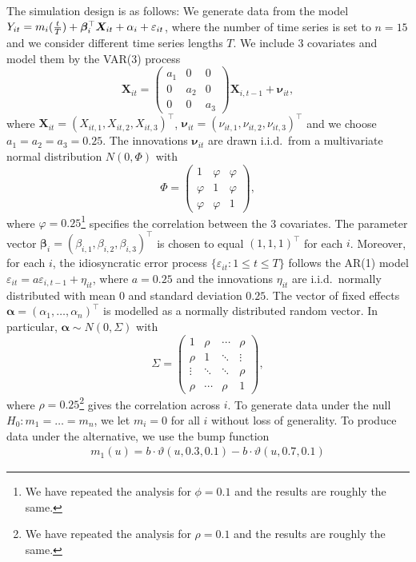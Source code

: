 \documentclass[12pt]{article}
\begin{document}
The simulation design is as follows: We generate data from the model $Y_{it} = m_i(\frac{t}{T}) + \bm{\beta}_i^\top \boldsymbol{X}_{it} +  \alpha_i  + \varepsilon_{it}$, where the number of time series is set to $n = 15$ and we consider different time series lengths $T$. We include $3$ covariates and model them by the VAR(3) process
\[ \boldsymbol{X}_{it} = \begin{pmatrix} a_1 & 0 & 0 \\ 0 & a_2 & 0 \\ 0 & 0 & a_3 \end{pmatrix} \boldsymbol{X}_{i,t-1} + \boldsymbol{\nu}_{it}, \] 
where $\boldsymbol{X}_{it} = ( X_{it,1}, X_{it,2}, X_{it,3} )^\top$, $\boldsymbol{\nu}_{it} = ( \nu_{it,1}, \nu_{it,2}, \nu_{it,3} )^\top$ and we choose $a_1 = a_2 = a_3 = 0.25$. The innovations $\boldsymbol{\nu}_{it}$ are drawn i.i.d.\ from a multivariate normal distribution $N(0,\Phi)$ with
\[ \Phi = \begin{pmatrix} 1 & \varphi & \varphi \\ \varphi & 1 & \varphi \\ \varphi & \varphi & 1 \end{pmatrix}, \]
where $\varphi = 0.25$\footnote{We have repeated the analysis for $\phi = 0.1$ and the results are roughly the same.} specifies the correlation between the 3 covariates. The parameter vector $\boldsymbol{\beta}_i = (\beta_{i,1},\beta_{i,2},\beta_{i,3})^\top$ is chosen to equal $(1,1,1)^\top$ for each $i$. Moreover, for each $i$, the idiosyncratic error process $\{\varepsilon_{it}: 1 \le t \le T\}$ follows the AR(1) model $\varepsilon_{it} = a \varepsilon_{i, t-1} + \eta_{it}$, where $a = 0.25$ and the innovations $\eta_{it}$ are i.i.d.\ normally distributed with mean $0$ and standard deviation $0.25$. 
The vector of fixed effects $\boldsymbol{\alpha} = (\alpha_1,\ldots,\alpha_n)^\top$ is modelled as a normally distributed random vector. In particular, $\boldsymbol{\alpha} \sim N(0,\Sigma)$ with
\[ \Sigma =
\begin{pmatrix}
1      & \rho   & \cdots & \rho   \\
\rho   & 1      & \ddots & \vdots \\
\vdots & \ddots & \ddots & \rho   \\
\rho   & \cdots & \rho   & 1
\end{pmatrix},
\]
where $\rho = 0.25$\footnote{We have repeated the analysis for $\rho = 0.1$ and the results are roughly the same.} gives the correlation across $i$.
To generate data under the null $H_0: m_1 = \ldots = m_n$, we let $m_i = 0$ for all $i$ without loss of generality. To produce data under the alternative, we use the bump function
\begin{align}
m_1(u) =  b \cdot  \vartheta(u, 0.3, 0.1) - b  \cdot  \vartheta(u,0.7, 0.1)  \label{eq:bump-fct}
\end{align}
\end{document}
